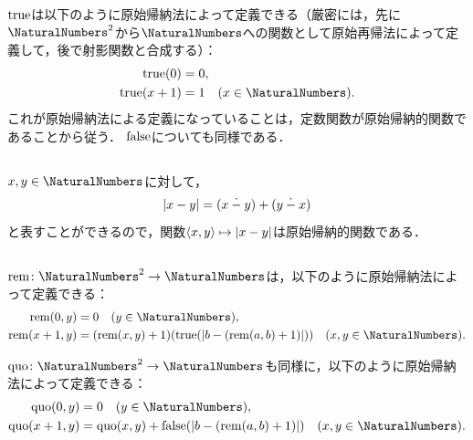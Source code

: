 \(\operatorname{true}\)は以下のように原始帰納法によって定義できる（厳密には，先に\(\NaturalNumbers^2\)から\(\NaturalNumbers\)への関数として原始再帰法によって定義して，後で射影関数と合成する）：
\begin{align*}
	\apply{\truefunction}{0}     & = 0,                                          \\
	\apply{\truefunction}{x + 1} & = 1 \quad \text{(\(x \in \NaturalNumbers\))}.
\end{align*}
これが原始帰納法による定義になっていることは，定数関数が原始帰納的関数であることから従う．
\(\operatorname{false}\)についても同様である．


\subsection*{}

\(x, y \in \NaturalNumbers\)に対して，
\[
	\absolute{x - y} = \paren{x \entireminus y} + \paren{y \entireminus x}
\]
と表すことができるので，関数\(\pair{x, y} \mapsto \absolute{x - y}\)は原始帰納的関数である．

\subsection*{}

\(\rem \colon \NaturalNumbers^2 \to \NaturalNumbers\)は，以下のように原始帰納法によって定義できる：
\begin{align*}
	\apply{\rem}{0, y}     & = 0 \quad \text{(\(y \in \NaturalNumbers\))},                                                                 \\
	\apply{\rem}{x + 1, y} & = \paren{\apply{\rem}{x, y} + 1} \paren{\apply{\truefunction}{\absolute{b - \paren{\apply{\rem}{a, b} + 1}}}}
	\quad \text{(\(x, y \in \NaturalNumbers\))}.
\end{align*}

\(\quo \colon \NaturalNumbers^2 \to \NaturalNumbers\)も同様に，以下のように原始帰納法によって定義できる：
\begin{align*}
	\apply{\quo}{0, y}     & = 0 \quad \text{(\(y \in \NaturalNumbers\))},                                                \\
	\apply{\quo}{x + 1, y} & = \apply{\quo}{x, y} + \apply{\falsefunction}{\absolute{b - \paren{\apply{\rem}{a, b} + 1}}}
	\quad \text{(\(x, y \in \NaturalNumbers\))}.
\end{align*}
